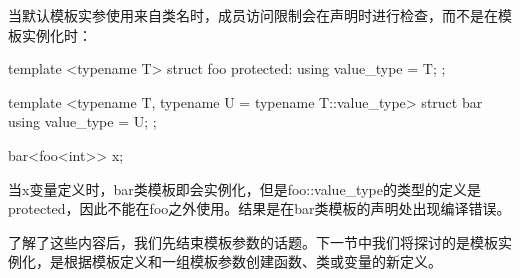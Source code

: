 当默认模板实参使用来自类名时，成员访问限制会在声明时进行检查，而不是在模板实例化时：

\begin{cpp}
template <typename T>
struct foo
{
	protected:
	using value_type = T;
};

template <typename T, typename U = typename T::value_type>
struct bar
{
	using value_type = U;
};

bar<foo<int>> x;
\end{cpp}

当x变量定义时，bar类模板即会实例化，但是foo::value\_type的类型的定义是protected，因此不能在foo之外使用。结果是在bar类模板的声明处出现编译错误。

了解了这些内容后，我们先结束模板参数的话题。下一节中我们将探讨的是模板实例化，是根据模板定义和一组模板参数创建函数、类或变量的新定义。








